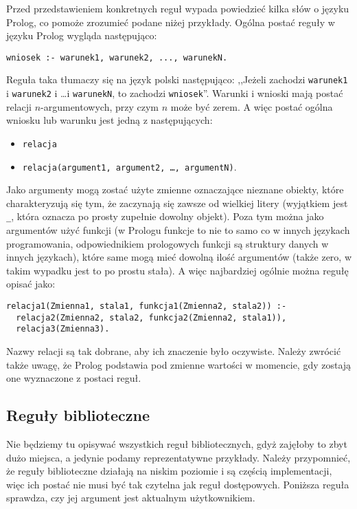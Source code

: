 \documentclass{classrep}
\begin{document}
Przed przedstawieniem konkretnych reguł wypada powiedzieć kilka słów o języku Prolog, co pomoże zrozumieć podane niżej przykłady. Ogólna postać reguły w języku Prolog wygląda następująco:
\begin{verbatim}
wniosek :- warunek1, warunek2, ..., warunekN. 
\end{verbatim}
Reguła taka tłumaczy się na język polski następująco: ,,Jeżeli zachodzi \texttt{warunek1} i \texttt{warunek2} i \ldots i \texttt{warunekN}, to zachodzi \texttt{wniosek}''.
Warunki i wnioski mają postać relacji \(n\)-argumentowych, przy czym \(n\) może być zerem. A więc postać ogólna wniosku lub warunku jest jedną z następujących:
\begin{itemize}
\item \texttt{relacja}
\item \texttt{relacja(argument1, argument2, \ldots, argumentN)}.
\end{itemize}
Jako argumenty mogą zostać użyte zmienne oznaczające nieznane obiekty, które charakteryzują się tym, że zaczynają się zawsze od wielkiej litery (wyjątkiem jest \texttt{\_}, która
oznacza po prosty zupełnie dowolny objekt). Poza tym można jako argumentów użyć funkcji (w Prologu funkcje to nie to samo co w innych językach programowania, odpowiednikiem
prologowych funkcji są struktury danych w innych językach), które same mogą mieć dowolną ilość argumentów (także zero, w takim wypadku jest to po prostu stała).
A więc najbardziej ogólnie można regułę opisać jako:
\begin{verbatim}
relacja1(Zmienna1, stala1, funkcja1(Zmienna2, stala2)) :- 
  relacja2(Zmienna2, stala2, funkcja2(Zmienna2, stala1)),
  relacja3(Zmienna3).
\end{verbatim}
Nazwy relacji są tak dobrane, aby ich znaczenie było oczywiste.
Należy zwrócić także uwagę, że Prolog podstawia pod zmienne wartości w momencie, gdy zostają one wyznaczone z postaci reguł.

\subsection{Reguły biblioteczne}
Nie będziemy tu opisywać wszystkich reguł bibliotecznych, gdyż zajęłoby to zbyt dużo miejsca, a jedynie podamy reprezentatywne przykłady. Należy przypomnieć, że reguły biblioteczne działają
na niskim poziomie i są częścią implementacji, więc ich postać nie musi być tak czytelna jak reguł dostępowych. 
Poniższa reguła sprawdza, czy jej argument jest aktualnym użytkownikiem.
\end{document}
